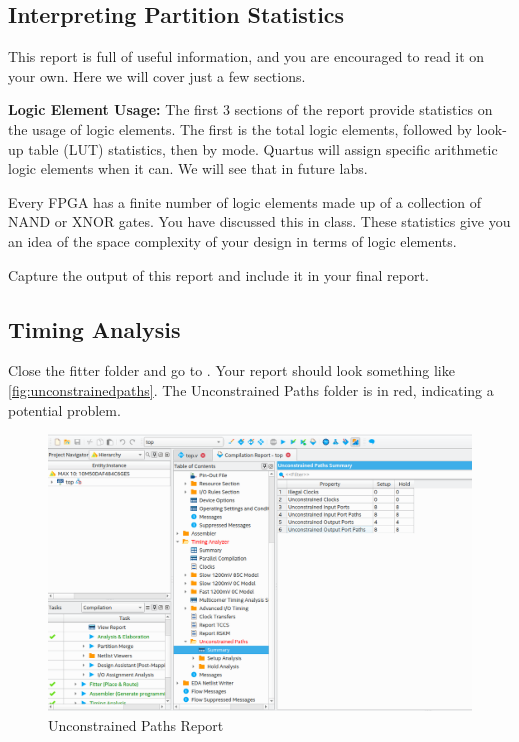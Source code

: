 \documentclass[12pt]{labmanual}
\begin{document}
\subsection{Interpreting Partition Statistics}
This report is full of useful information, and you are encouraged to read it on your own. Here we will cover just a few sections.

\textbf{Logic Element Usage:} The first 3 sections of the report provide statistics on the usage of logic elements. The first is the total logic elements, followed by look-up table (LUT) statistics, then by mode. Quartus will assign specific arithmetic logic elements when it can. We will see that in future labs.

Every FPGA has a finite number of logic elements made up of a collection of NAND or XNOR gates. You have discussed this in class. These statistics give you an idea of the space complexity of your design in terms of logic elements.

\begin{question}
    Capture the output of this report and include it in your final report.
\end{question}

\subsection{Timing Analysis}
Close the fitter folder and go to . Your report should look something like \autoref{fig:unconstrainedpaths}. The Unconstrained Paths folder is in red, indicating a potential problem. 
\begin{figure}
    \centering
    \includegraphics[width=\linewidth]{unconstrainedpaths.png}
    \caption{Unconstrained Paths Report}
    \label{fig:unconstrainedpaths}
\end{figure}
\end{document}
